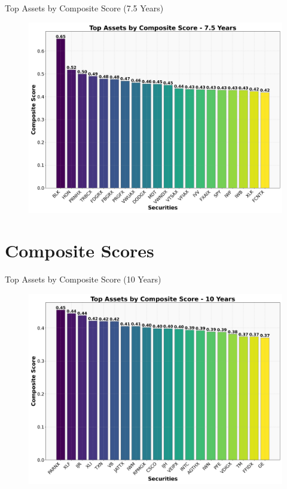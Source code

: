 \documentclass{beamer}
\begin{document}
\begin{frame}{Top Assets by Composite Score (7.5 Years)}
    \begin{figure}
        \centering
        \includegraphics[width=0.9\linewidth]{top_assets_composite_score_7_5_years.png}
    \end{figure}
\end{frame}

\section{Composite Scores}
\begin{frame}{Top Assets by Composite Score (10 Years)}
    \begin{figure}
        \centering
        \includegraphics[width=0.9\linewidth]{top_assets_composite_score_10_years.png}
    \end{figure}
\end{frame}
\end{document}
